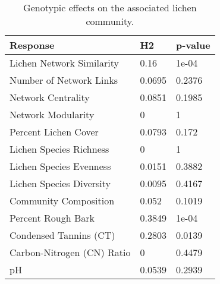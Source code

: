 \begin{table}[ht]
\centering
\begin{tabular}{lll}
  \hline
Response & H2 & p-value \\ 
  \hline
Lichen Network Similarity & 0.16 & 1e-04 \\ 
  Number of Network Links & 0.0695 & 0.2376 \\ 
  Network Centrality & 0.0851 & 0.1985 \\ 
  Network Modularity & 0 & 1 \\ 
  Percent Lichen Cover & 0.0793 & 0.172 \\ 
  Lichen Species Richness & 0 & 1 \\ 
  Lichen Species Evenness & 0.0151 & 0.3882 \\ 
  Lichen Species Diversity & 0.0095 & 0.4167 \\ 
  Community Composition & 0.052 & 0.1019 \\ 
  Percent Rough Bark & 0.3849 & 1e-04 \\ 
  Condensed Tannins (CT) & 0.2803 & 0.0139 \\ 
  Carbon-Nitrogen (CN) Ratio & 0 & 0.4479 \\ 
  pH & 0.0539 & 0.2939 \\ 
   \hline
\end{tabular}
\caption{Genotypic effects on the associated lichen community.} 
\label{tab:h2_table}
\end{table}
